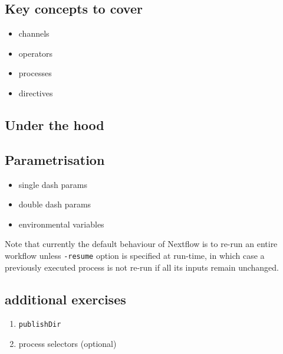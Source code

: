 \subsection{Key concepts to cover}



\begin{itemize}
 \item channels
 \item operators
 \item processes
 \item directives
\end{itemize}

\subsection {Under the hood}



\subsection{Parametrisation}

\begin{itemize}
 \item single dash params
 \item double dash params
 \item environmental variables
\end{itemize}

\begin{note}
Note that currently the default behaviour of Nextflow is to re-run an entire workflow 
unless \texttt{-resume} option is specified at run-time, in which case a previously 
executed process is not re-run if all its inputs remain unchanged.

\end{note}


\subsection{additional exercises}

\begin{enumerate}
 \item \texttt{publishDir}
 \item process selectors (optional)
\end{enumerate}


